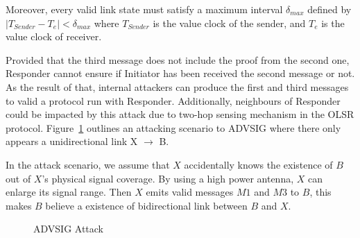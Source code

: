 Moreover, every valid link state must satisfy a maximum interval $\delta_{max}$ defined by $|T_{Sender} - T_e | < \delta_{max}$ where $T_{Sender}$ is the value clock of the sender, and $T_e$ is the value clock of receiver. 

Provided that the third message does not include the proof from the second one, Responder cannot ensure if Initiator has been received the second message or not. As the result of that, internal attackers can produce the first and third messages to valid a protocol run with Responder. Additionally,  neighbours of Responder could be impacted by this attack due to two-hop sensing mechanism in the OLSR protocol.  Figure~\ref{advsigattack3} outlines an attacking scenario to ADVSIG where there only appears a unidirectional link X $\rightarrow$ B.

In the attack scenario, we assume that $X$ accidentally knows the existence of $B$ out of $X$'s physical signal coverage. By using a high power antenna, $X$ can enlarge its signal range. Then $X$ emits valid messages $M1$ and $M3$ to $B$, this makes $B$ believe a existence of bidirectional link between $B$ and $X$.   

\begin{figure}
		\caption{ADVSIG Attack }\label{advsigattack3}
        \centering

	    \centering

\end{figure}

